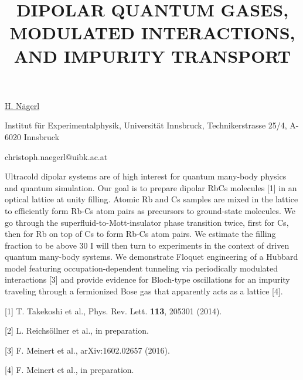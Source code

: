 \title{DIPOLAR QUANTUM GASES, MODULATED INTERACTIONS, AND IMPURITY TRANSPORT}

\underline{H. N\"{a}gerl} 

{\normalsize{\vspace{-4mm}
Institut f\"{u}r Experimentalphysik,
Universit\"{a}t Innsbruck,
Technikerstrasse 25/4,
A-6020 Innsbruck

\email christoph.naegerl@uibk.ac.at}}

Ultracold dipolar systems are of high interest for quantum many-body physics and quantum simulation. Our goal is to prepare dipolar RbCs molecules [1] in an optical lattice at unity filling. Atomic Rb and Cs samples are mixed in the lattice to efficiently form Rb-Cs atom pairs as precursors to ground-state molecules. We go through the superfluid-to-Mott-insulator phase transition twice, first for Cs, then for Rb on top of Cs to form Rb-Cs atom pairs. We estimate the filling fraction to be above 30%
I will then turn to experiments in the context of driven quantum many-body systems. We demonstrate Floquet engineering of a Hubbard model featuring occupation-dependent tunneling via periodically modulated interactions [3] and provide evidence for Bloch-type oscillations for an impurity traveling through a fermionized Bose gas that apparently acts as a lattice [4].


{\normalsize
[1] T. Takekoshi et al., Phys. Rev. Lett. \textbf{113}, 205301 (2014).
\vsp

[2] L. Reichs\"{o}llner et al., in preparation.
\vsp

[3] F. Meinert et al., arXiv:1602.02657 (2016).
\vsp

[4] F. Meinert et al., in preparation.
}



\vspace{\baselineskip} 